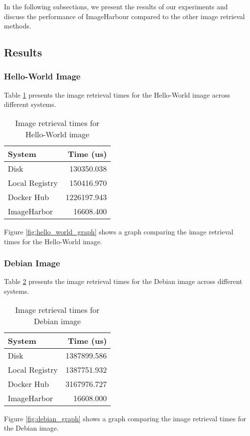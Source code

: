 In the following subsections, we present the results of our experiments and discuss the performance of ImageHarbour compared to the other image retrieval methods.

\subsection{Results}

\subsubsection{Hello-World Image}
Table \ref{tab:hello_world_results} presents the image retrieval times for the Hello-World image across different systems.

\begin{table}[h]
\centering
\begin{tabular}{|l|r|}
\hline
System & Time (us) \\
\hline
Disk & 130350.038 \\
Local Registry & 150416.970 \\
Docker Hub & 1226197.943 \\
ImageHarbor & 16608.400 \\
\hline
\end{tabular}
\caption{Image retrieval times for Hello-World image}
\label{tab:hello_world_results}
\end{table}

Figure \ref{fig:hello_world_graph} shows a graph comparing the image retrieval times for the Hello-World image.


\subsubsection{Debian Image}
Table \ref{tab:debian_results} presents the image retrieval times for the Debian image across different systems.

\begin{table}[h]
\centering
\begin{tabular}{|l|r|}
\hline
System & Time (us) \\
\hline
Disk & 1387899.586 \\
Local Registry & 1387751.932 \\
Docker Hub & 3167976.727 \\
ImageHarbor & 16608.000 \\
\hline
\end{tabular}
\caption{Image retrieval times for Debian image}
\label{tab:debian_results}
\end{table}

Figure \ref{fig:debian_graph} shows a graph comparing the image retrieval times for the Debian image.

